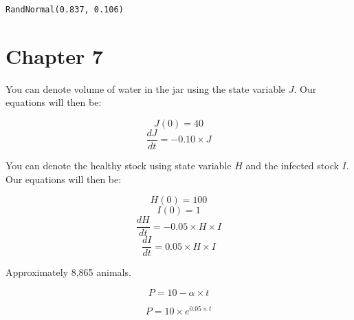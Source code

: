 \documentclass[]{memoir}
\begin{document}
\lstinline!RandNormal(0.837, 0.106)!

\section{Chapter 7}


You can denote volume of water in the jar using the state variable $J$.
Our equations will then be:

\[ J(0) = 40 \] \[ \frac{dJ}{dt} = -0.10 \times J\]


You can denote the healthy stock using state variable $H$ and the
infected stock $I$. Our equations will then be:

\[ H(0) = 100 \] \[ I(0) = 1 \]
\[ \frac{dH}{dt} = -0.05 \times H \times I \]
\[ \frac{dI}{dt} = 0.05 \times H \times I \]


Approximately 8,865 animals.


\[ P = 10 - \alpha \times t\]


\[ P = 10 \times e^{0.05\times t}\]

\end{document}
